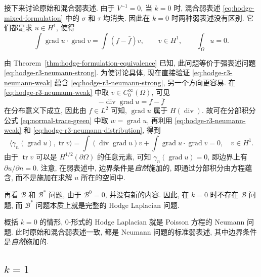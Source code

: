 {接下来讨论原始和混合弱表述. 由于 $V^{-1}=0$, 当 $k=0$ 时, 混合弱表述 \eqref{eq:hodge-mixed-formulation} 中的 $\sigma$ 和 $\tau$ 均消失. 因此在 $k=0$ 时两种弱表述没有区别. 它们都是求 $u\in H^1$, 使得}
\begin{equation}\label{eq:hodge-r3-neumann-weak}
\int\operatorname{grad}u\cdot\operatorname{grad}v=\int(f-\bar f)v,\qquad v\in H^1,\qquad\int_\Omega u=0.
\end{equation}

{由 Theorem~\ref{thm:hodge-formulation-equivalence} 已知, 此问题等价于强表述问题 \eqref{eq:hodge-r3-neumann-strong}. 为使讨论具体, 现在直接验证 \eqref{eq:hodge-r3-neumann-weak} 蕴含 \eqref{eq:hodge-r3-neumann-strong}, 另一个方向更容易. 在 \eqref{eq:hodge-r3-neumann-weak} 中取 $v\in C_0^\infty(\Omega)$, 可见}
\begin{equation}\label{eq:hodge-r3-neumann-distribution}
-\operatorname{div}\operatorname{grad}u=f-\bar f
\end{equation}
{在分布意义下成立, 因此由 $f\in L^2$ 可知, $\operatorname{grad}u$ 属于 $H(\operatorname{div})$. 故可在分部积分公式 \eqref{eq:normal-trace-green} 中取 $w=\operatorname{grad}u$, 再利用 \eqref{eq:hodge-r3-neumann-weak} 和 \eqref{eq:hodge-r3-neumann-distribution}, 得到}
\[
\langle\gamma_n(\operatorname{grad}u),\operatorname{tr}v\rangle=\int(\operatorname{div}\operatorname{grad}u)v+\int\operatorname{grad}u\cdot\operatorname{grad}v=0,\quad v\in H^1.
\]
{由于 $\operatorname{tr}v$ 可以是 $H^{1/2}(\partial\Omega)$ 的任意元素, 可知 $\gamma_n(\operatorname{grad}u)=0$, 即边界上有 $\partial u/\partial n=0$. 注意, 在弱表述中, 边界条件是\emph{自然}施加的, 即通过分部积分由方程蕴含, 而不是施加在求解 $u$ 所在的空间中.}

{再看 $\mathcal B$ 和 $\mathcal B^*$ 问题, 由于 $\mathcal B^0=0$, 并没有新的内容. 因此, 在 $k=0$ 时不存在 $\mathcal B$ 问题, 而 $\mathcal B^*$ 问题本质上就是完整的 Hodge Laplacian 问题.}

{概括 $k=0$ 的情形, $0$-形式的 Hodge Laplacian 就是 Poisson 方程的 Neumann 问题. 此时原始和混合弱表述一致, 都是 Neumann 问题的标准弱表述, 其中边界条件是\emph{自然}施加的.}

\subsection{$k=1$}\label{subsec:hodge-r3-k1}

